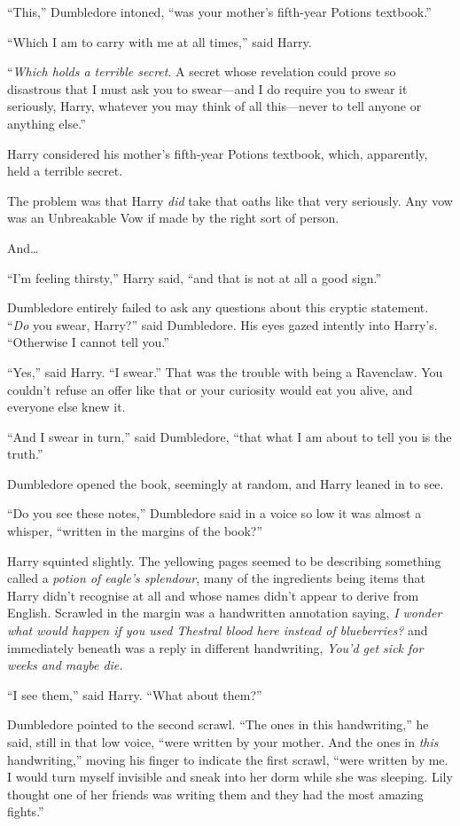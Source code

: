 “This,” Dumbledore intoned, “was your mother’s fifth-year Potions textbook.”

“Which I am to carry with me at all times,” said Harry.

“\emph{Which holds a terrible secret}. A secret whose revelation could prove so disastrous that I must ask you to swear—and I do require you to swear it seriously, Harry, whatever you may think of all this—never to tell anyone or anything else.”

Harry considered his mother’s fifth-year Potions textbook, which, apparently, held a terrible secret.

The problem was that Harry \emph{did} take that oaths like that very seriously. Any vow was an Unbreakable Vow if made by the right sort of person.

And…

“I’m feeling thirsty,” Harry said, “and that is not at all a good sign.”

Dumbledore entirely failed to ask any questions about this cryptic statement. “\emph{Do} you swear, Harry?” said Dumbledore. His eyes gazed intently into Harry’s.
“Otherwise I cannot tell you.”

“Yes,” said Harry.
“I swear.” That was the trouble with being a Ravenclaw. You couldn’t refuse an offer like that or your curiosity would eat you alive, and everyone else knew it.

“And I swear in turn,” said Dumbledore, “that what I am about to tell you is the truth.”

Dumbledore opened the book, seemingly at random, and Harry leaned in to see.

“Do you see these notes,” Dumbledore said in a voice so low it was almost a whisper, “written in the margins of the book?”

Harry squinted slightly. The yellowing pages seemed to be describing something called a \emph{potion of eagle’s splendour}, many of the ingredients being items that Harry didn’t recognise at all and whose names didn’t appear to derive from English. Scrawled in the margin was a handwritten annotation saying, \emph{I wonder what would happen if you used Thestral blood here instead of blueberries?} and immediately beneath was a reply in different handwriting, \emph{You’d get sick for weeks and maybe die.}

“I see them,” said Harry.
“What about them?”

Dumbledore pointed to the second scrawl.
“The ones in this handwriting,” he said, still in that low voice, “were written by your mother. And the ones in \emph{this} handwriting,” moving his finger to indicate the first scrawl, “were written by me. I would turn myself invisible and sneak into her dorm while she was sleeping. Lily thought one of her friends was writing them and they had the most amazing fights.”

